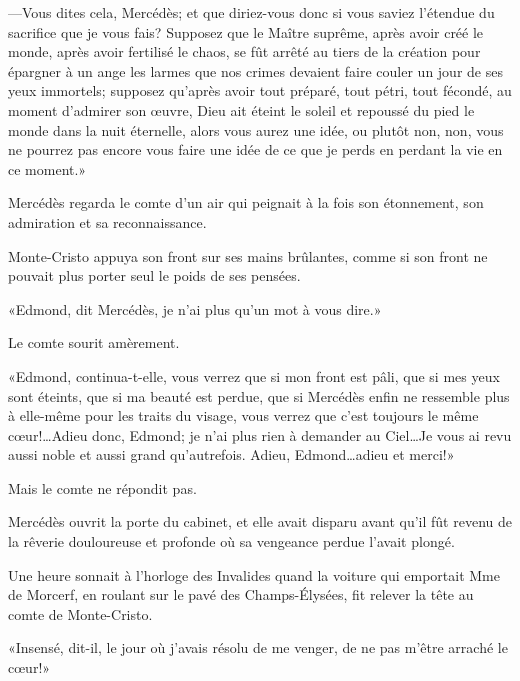 —Vous dites cela, Mercédès; et que diriez-vous donc si vous saviez l'étendue du sacrifice que je vous fais? Supposez que le Maître suprême, après avoir créé le monde, après avoir fertilisé le chaos, se fût arrêté au tiers de la création pour épargner à un ange les larmes que nos crimes devaient faire couler un jour de ses yeux immortels; supposez qu'après avoir tout préparé, tout pétri, tout fécondé, au moment d'admirer son œuvre, Dieu ait éteint le soleil et repoussé du pied le monde dans la nuit éternelle, alors vous aurez une idée, ou plutôt non, non, vous ne pourrez pas encore vous faire une idée de ce que je perds en perdant la vie en ce moment.» 

Mercédès regarda le comte d'un air qui peignait à la fois son étonnement, son admiration et sa reconnaissance. 

Monte-Cristo appuya son front sur ses mains brûlantes, comme si son front ne pouvait plus porter seul le poids de ses pensées. 

«Edmond, dit Mercédès, je n'ai plus qu'un mot à vous dire.» 

Le comte sourit amèrement. 

«Edmond, continua-t-elle, vous verrez que si mon front est pâli, que si mes yeux sont éteints, que si ma beauté est perdue, que si Mercédès enfin ne ressemble plus à elle-même pour les traits du visage, vous verrez que c'est toujours le même cœur!\dots Adieu donc, Edmond; je n'ai plus rien à demander au Ciel\dots Je vous ai revu aussi noble et aussi grand qu'autrefois. Adieu, Edmond\dots adieu et merci!» 

Mais le comte ne répondit pas. 

Mercédès ouvrit la porte du cabinet, et elle avait disparu avant qu'il fût revenu de la rêverie douloureuse et profonde où sa vengeance perdue l'avait plongé. 

Une heure sonnait à l'horloge des Invalides quand la voiture qui emportait Mme de Morcerf, en roulant sur le pavé des Champs-Élysées, fit relever la tête au comte de Monte-Cristo. 

«Insensé, dit-il, le jour où j'avais résolu de me venger, de ne pas m'être arraché le cœur!» 
